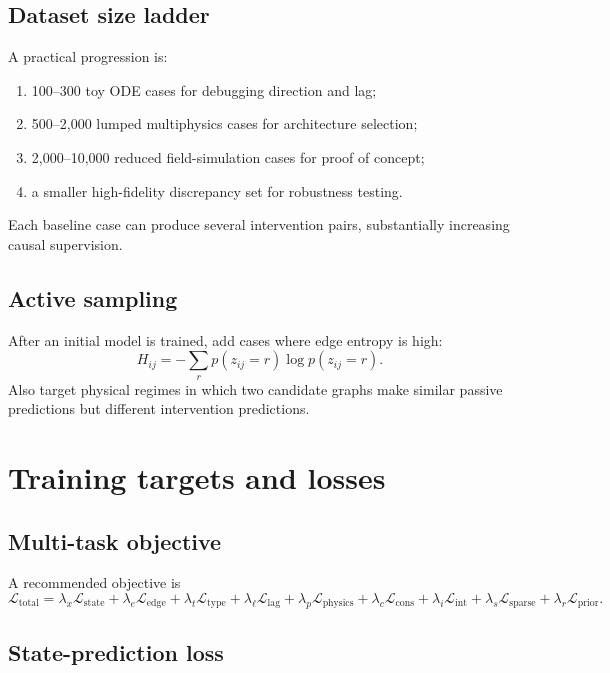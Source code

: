 \documentclass[11pt]{article}
\newcommand{\Lcal}{\mathcal{L}}
\newcommand{\Lstate}{\mathcal{L}_{\mathrm{state}}}
\newcommand{\Ledge}{\mathcal{L}_{\mathrm{edge}}}
\newcommand{\Ltype}{\mathcal{L}_{\mathrm{type}}}
\newcommand{\Llag}{\mathcal{L}_{\mathrm{lag}}}
\newcommand{\Lphysics}{\mathcal{L}_{\mathrm{physics}}}
\newcommand{\Lcons}{\mathcal{L}_{\mathrm{cons}}}
\newcommand{\Lsparse}{\mathcal{L}_{\mathrm{sparse}}}
\newcommand{\Lprior}{\mathcal{L}_{\mathrm{prior}}}
\newcommand{\Lint}{\mathcal{L}_{\mathrm{int}}}
\begin{document}
\subsection{Dataset size ladder}

A practical progression is:
\begin{enumerate}[leftmargin=1.6em]
    \item 100--300 toy ODE cases for debugging direction and lag;
    \item 500--2,000 lumped multiphysics cases for architecture selection;
    \item 2,000--10,000 reduced field-simulation cases for proof of concept;
    \item a smaller high-fidelity discrepancy set for robustness testing.
\end{enumerate}
Each baseline case can produce several intervention pairs, substantially increasing causal supervision.

\subsection{Active sampling}

After an initial model is trained, add cases where edge entropy is high:
\begin{equation}
H_{ij}=-\sum_r p(z_{ij}=r)\log p(z_{ij}=r).
\end{equation}
Also target physical regimes in which two candidate graphs make similar passive predictions but different intervention predictions.

\section{Training targets and losses}

\subsection{Multi-task objective}

A recommended objective is
\begin{equation}
\Lcal_{\mathrm{total}}
=\lambda_x\Lstate
+\lambda_e\Ledge
+\lambda_t\Ltype
+\lambda_{\ell}\Llag
+\lambda_p\Lphysics
+\lambda_c\Lcons
+\lambda_i\Lint
+\lambda_s\Lsparse
+\lambda_r\Lprior.
\label{eq:total_loss}
\end{equation}

\subsection{State-prediction loss}
\end{document}
